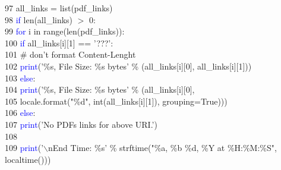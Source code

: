 97	 \hspace*{5mm}    \hspace*{5mm}all\_links = list(pdf\_links)\\
98	 \hspace*{5mm}    \hspace*{5mm}\textcolor{blue}{if} len(all\_links) $>$ 0:\\
99	 \hspace*{5mm}        \hspace*{10mm}\textcolor{blue}{for} i in range(len(pdf\_links)):\\
100	 \hspace*{5mm}            \hspace*{15mm}\textcolor{blue}{if} all\_links[i][1] == '???':\\
101	 \hspace*{5mm}                \hspace*{20mm}\# don't format Content-Lenght\\
102	 \hspace*{5mm}                \hspace*{20mm}\textcolor{blue}{print}('\%s, File Size: \%s bytes' \% (all\_links[i][0], all\_links[i][1]))\\
103	 \hspace*{5mm}            \hspace*{15mm}\textcolor{blue}{else}:\\
104	 \hspace*{5mm}                \hspace*{20mm}\textcolor{blue}{print}('\%s, File Size: \%s bytes' \% (all\_links[i][0],\\
105	 \hspace*{5mm}                                                  \hspace*{62.5mm}locale.format("\%d", int(all\_links[i][1]), grouping=True)))\\
106	 \hspace*{5mm}    \hspace*{5mm}\textcolor{blue}{else}:\\
107	 \hspace*{5mm}        \hspace*{10mm}\textcolor{blue}{print}('No PDFs links for above URI.')\\
108	 \hspace*{5mm}\\
109	 \hspace*{5mm}    \hspace*{5mm}\textcolor{blue}{print}('$\backslash$nEnd Time:  \hspace*{2.5mm}\%s' \% strftime("\%a,  \hspace*{2.5mm}\%b \%d, \%Y at \%H:\%M:\%S", localtime()))\\
